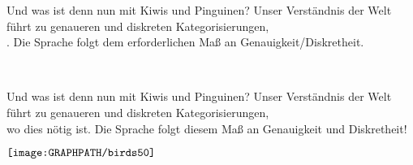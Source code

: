\ifdefined\HANDOUT
  \begin{frame}
    {Und was ist denn nun mit Kiwis und Pinguinen?}
    \onslide<+->
    \onslide<+->
    Unser Verständnis der Welt führt zu genaueren und diskreten Kategorisierungen,\\
    . \alert{Die Sprache folgt dem erforderlichen Maß an Genauigkeit\slash Diskretheit.}\\
    \Zeile
    \onslide<+->
    \centering
    \\
    \Halbzeile
  \end{frame}
\else
  \begin{frame}
    {Und was ist denn nun mit Kiwis und Pinguinen?}
    \onslide<+->
    \onslide<+->
    Unser Verständnis der Welt führt zu genaueren und diskreten Kategorisierungen,\\
    wo dies nötig ist. \alert{Die Sprache folgt diesem Maß an Genauigkeit und Diskretheit!}\\
    \Zeile
    \onslide<+->
    \centering
    \begin{minipage}{0.9\textwidth}
    \centering
      $\vcenter{\hbox{\texttt{[image: \\GRAPHPATH/birds50]}}}$\hspace{0.1\textwidth}
    \end{minipage}\\
  \end{frame}
\fi

